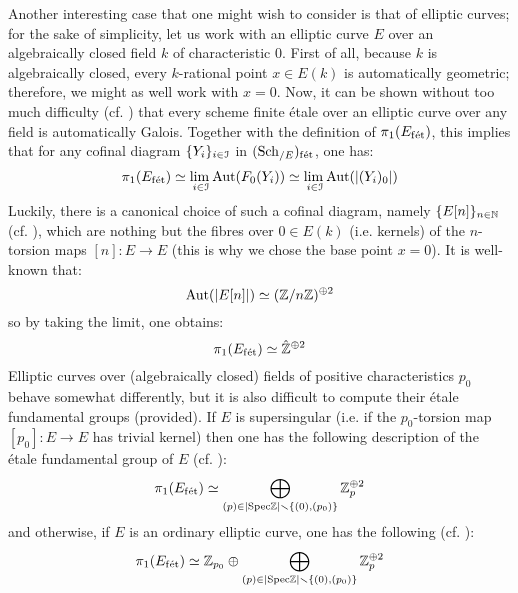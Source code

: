 \begin{example}
            Another interesting case that one might wish to consider is that of elliptic curves; for the sake of simplicity, let us work with an elliptic curve $E$ over an algebraically closed field $k$ of characteristic $0$. First of all, because $k$ is algebraically closed, every $k$-rational point $x \in E(k)$ is automatically geometric; therefore, we might as well work with $x = 0$. Now, it can be shown without too much difficulty (cf. \cite[Proposition 5.11]{kundu_etale_fundamental_group_of_elliptic_curves}) that every scheme finite \'etale over an elliptic curve over any field is automatically Galois. Together with the definition of $\pi_1(E_{\mathrm{f\acute{e}t}})$, this implies that for any cofinal diagram $\{Y_i\}_{i \in \mathcal{I}}$ in $(\mathrm{Sch}_{/E})_{\mathrm{f\acute{e}t}}$, one has:
                $$\pi_1(E_{\mathrm{f\acute{e}t}}) \simeq \underset{i \in \mathcal{I}}{\operatorname{lim} \:} \mathrm{Aut}(F_0(Y_i)) \simeq \underset{i \in \mathcal{I}}{\operatorname{lim} \:} \mathrm{Aut}(|(Y_i)_0|)$$
            Luckily, there is a canonical choice of such a cofinal diagram, namely $\{E[n]\}_{n \in \mathbb{N}}$ (cf. \cite[Proposition 3.8]{kundu_etale_fundamental_group_of_elliptic_curves}), which are nothing but the fibres over $0 \in E(k)$ (i.e. kernels) of the $n$-torsion maps $[n]: E \to E$ (this is why we chose the base point $x = 0$). It is well-known that:
                $$\mathrm{Aut}(|E[n]|) \simeq (\mathbb{Z}/n\mathbb{Z})^{\oplus 2}$$
            so by taking the limit, one obtains:
                $$\pi_1(E_{\mathrm{f\acute{e}t}}) \simeq \hat{\mathbb{Z}}^{\oplus 2}$$
            Elliptic curves over (algebraically closed) fields of positive characteristics $p_0$ behave somewhat differently, but it is also difficult to compute their \'etale fundamental groups (provided). If $E$ is supersingular (i.e. if the $p_0$-torsion map $[p_0]: E \to E$ has trivial kernel) then one has the following description of the \'etale fundamental group of $E$ (cf. \cite[Proposition 5.13]{kundu_etale_fundamental_group_of_elliptic_curves}):
                $$\pi_1(E_{\mathrm{f\acute{e}t}}) \simeq \bigoplus_{(p) \in |\mathrm{Spec} \mathbb{Z}| \smallsetminus \{(0), (p_0)\}} \mathbb{Z}_p^{\oplus 2}$$
            and otherwise, if $E$ is an ordinary elliptic curve, one has the following (cf. \cite[Proposition 5.14]{kundu_etale_fundamental_group_of_elliptic_curves}):
                $$\pi_1(E_{\mathrm{f\acute{e}t}}) \simeq \mathbb{Z}_{p_0} \oplus \bigoplus_{(p) \in |\mathrm{Spec} \mathbb{Z}| \smallsetminus \{(0), (p_0)\}} \mathbb{Z}_p^{\oplus 2}$$
        \end{example}
        
